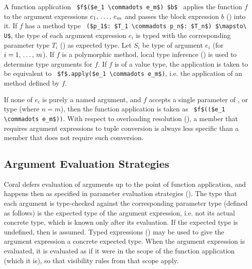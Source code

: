 A function application ~\lstinline!$f$($e_1 \commadots e_m$) $b$!~ applies the function $f$ to the argument expressions $e_1 ,\, \ldots ,\, e_m$ and passes the block expression $b$ () into it. If $f$ has a method type ~\lstinline!($p_1$: $T_1 \commadots p_n$: $T_n$) $\mapsto\ U$!, the type of each argument expression $e_i$ is typed with the corresponding parameter type $T_i$ () as expected type. Let $S_i$ be type of argument $e_i$ (for $i = 1 ,\, \ldots ,\, m$). If $f$ is a polymorphic method, local type inference () is used to determine type arguments for $f$. If $f$ is of a value type, the application is taken to be equivalent to ~\lstinline!$f$.apply($e_1 \commadots e_m$)!, i.e. the application of an  method defined by $f$. 

If none of $e_i$ is purely a named argument, and $f$ accepts a single parameter of ,  or  type (where $n = m$), then the function application is taken as ~\lstinline!$f$(($e_1 \commadots e_m$))!. With respect to overloading resolution (), a member that requires argument expressions to tuple conversion is always less specific than a member that does not require such conversion. 





\subsection{Argument Evaluation Strategies}
\label{sec:arg-eval-strategies}

Coral defers evaluation of arguments up to the point of function application, and happens then as specified in parameter evaluation strategies (). The type that each argument is type-checked against the corresponding parameter type (defined as follows) is the expected type of the argument expression, i.e. not its actual concrete type, which is known only after its evaluation. If the expected type is undefined, then  is assumed. Typed expressions () may be used to give the argument expression a concrete expected type. When the argument expression is evaluated, it is evaluated as if it were in the scope of the function application (which it is), so that visibility rules from that scope apply. 






